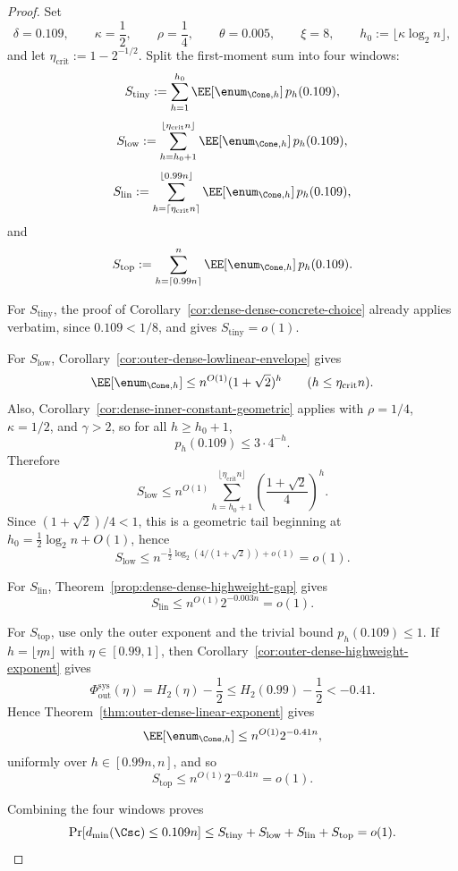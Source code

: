 \begin{proof}
Set
\[
\delta=0.109,
\qquad
\kappa=\frac12,
\qquad
\rho=\frac14,
\qquad
\theta=0.005,
\qquad
\xi=8,
\qquad
h_0:=\lfloor \kappa\log_2 n\rfloor,
\]
and let \(\eta_{\mathrm{crit}}:=1-2^{-1/2}\).
Split the first-moment sum into four windows:
\[
S_{\mathrm{tiny}}
:=
\sum_{h=1}^{h_0}\EE[\enum_{\Cone,h}]\,p_h(0.109),
\]
\[
S_{\mathrm{low}}
:=
\sum_{h=h_0+1}^{\lfloor \eta_{\mathrm{crit}}n\rfloor}\EE[\enum_{\Cone,h}]\,p_h(0.109),
\]
\[
S_{\mathrm{lin}}
:=
\sum_{h=\lceil \eta_{\mathrm{crit}}n\rceil}^{\lfloor 0.99n\rfloor}\EE[\enum_{\Cone,h}]\,p_h(0.109),
\]
and
\[
S_{\mathrm{top}}
:=
\sum_{h=\lceil 0.99n\rceil}^{n}\EE[\enum_{\Cone,h}]\,p_h(0.109).
\]

For \(S_{\mathrm{tiny}}\), the proof of Corollary~\ref{cor:dense-dense-concrete-choice} already applies verbatim,
since \(0.109<1/8\), and gives \(S_{\mathrm{tiny}}=o(1)\).

For \(S_{\mathrm{low}}\), Corollary~\ref{cor:outer-dense-lowlinear-envelope} gives
\[
\EE[\enum_{\Cone,h}] \le n^{O(1)}(1+\sqrt2)^h
\qquad(h\le \eta_{\mathrm{crit}}n).
\]
Also, Corollary~\ref{cor:dense-inner-constant-geometric} applies with \(\rho=1/4\), \(\kappa=1/2\), and \(\gamma>2\),
so for all \(h\ge h_0+1\),
\[
p_h(0.109)\le 3\cdot 4^{-h}.
\]
Therefore
\[
S_{\mathrm{low}}
\le
n^{O(1)}\sum_{h=h_0+1}^{\lfloor \eta_{\mathrm{crit}}n\rfloor}
\left(\frac{1+\sqrt2}{4}\right)^h.
\]
Since \((1+\sqrt2)/4<1\), this is a geometric tail beginning at \(h_0=\tfrac12\log_2 n+O(1)\), hence
\[
S_{\mathrm{low}}
\le
n^{-\frac12\log_2(4/(1+\sqrt2))+o(1)}
=
o(1).
\]

For \(S_{\mathrm{lin}}\), Theorem~\ref{prop:dense-dense-highweight-gap} gives
\[
S_{\mathrm{lin}}\le n^{O(1)}2^{-0.003n}=o(1).
\]

For \(S_{\mathrm{top}}\), use only the outer exponent and the trivial bound \(p_h(0.109)\le 1\).
If \(h=\lfloor \eta n\rfloor\) with \(\eta\in[0.99,1]\), then Corollary~\ref{cor:outer-dense-highweight-exponent} gives
\[
\Phi_{\mathrm{out}}^{\mathrm{sys}}(\eta)=H_2(\eta)-\frac12
\le
H_2(0.99)-\frac12
< -0.41.
\]
Hence Theorem~\ref{thm:outer-dense-linear-exponent} gives
\[
\EE[\enum_{\Cone,h}]
\le
n^{O(1)}2^{-0.41n},
\]
uniformly over \(h\in[0.99n,n]\), and so
\[
S_{\mathrm{top}}
\le
n^{O(1)}2^{-0.41n}
=
o(1).
\]

Combining the four windows proves
\[
\Pr[d_{\min}(\Csc)\le 0.109 n]
\le
S_{\mathrm{tiny}}+S_{\mathrm{low}}+S_{\mathrm{lin}}+S_{\mathrm{top}}
=
o(1).
\]
\end{proof}

